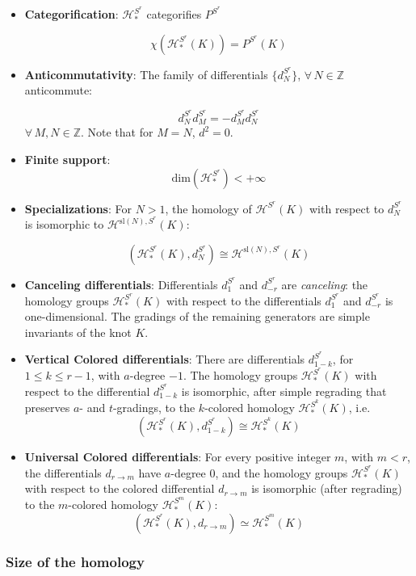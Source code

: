 \documentclass[a4paper,titlepage,twoside]{book}
\begin{document}
\begin{itemize}
\item \textbf{Categorification}: $\mathcal{H}^{S^r}_*$ categorifies $P^{S^r}$

\[
\chi{ (\mathcal{H}^{ S^r}_*{ (K) }) } = P^{ S^r}{ (K) }
\]
\item \textbf{ Anticommutativity}: The family of differentials $\lbrace d_N^{ S^r} \rbrace$, $\forall \, N \in \mathbb{Z}$  anticommute:

\[
d^{S^r}_N d^{S^r}_M = - d^{S^r}_M d^{S^r}_N
\]
$\forall \, M,N \in \mathbb{Z}$.  Note that for $M=N$, $d^2=0$.  
\item \textbf{Finite support}:
\[
\text{dim}{ (\mathcal{H}_*^{ S^r} ) } < + \infty
\]

\item \textbf{Specializations}: For $N >1$, the homology of $\mathcal{H}^{ S^r}{ (K)}$ with respect to $d^{S^r}_N$ is isomorphic to $\mathcal{H}^{ \text{sl}{(N)}, S^r}{ (K)}$: 

\[
\left( \mathcal{H}_*^{S^r}{ (K)}, d_N^{S^r}  \right) \cong \mathcal{H}^{ \text{sl}{ (N)}, S^r}{ (K)}
\]
\item \textbf{Canceling differentials}: Differentials $d_1^{S^r}$ and $d^{S^r}_{-r}$ are \emph{canceling}: the homology groups $\mathcal{H}^{ S^r}_*{ (K)}$ with respect to the differentials $d_1^{S^r}$ and $d^{S^r}_{-r}$ is one-dimensional.  The gradings of the remaining generators are simple invariants of the knot $K$.  
\item \textbf{Vertical Colored differentials}: There are differentials $d^{S^r}_{1-k}$, for $1 \leq k \leq r-1$, with $a$-degree $-1$.  The homology groups $\mathcal{H}_*^{ S^r}{ (K) }$ with respect to the differential $d^{S^r}_{ 1-k}$ is isomorphic, after simple regrading that preserves $a$- and $t$-gradings, to the $k$-colored homology $\mathcal{H}_*^{S^k}{ (K)}$, i.e.
\[
\left( \mathcal{H}_*^{S^r}{ (K) } , d^{S^r}_{ 1-k } \right) \cong \mathcal{H}_*^{ S^k}{ (K)} 
\]
\item \textbf{Universal Colored differentials}: For every positive integer $m$, with $m<r$, the differentials $d_{r\to m}$ have $a$-degree $0$, and the homology groups $\mathcal{H}_*^{S^r}{(K)}$ with respect to the colored differential $d_{r\to m}$ is isomorphic (after regrading) to the $m$-colored homology $\mathcal{H}_*^{S^m}{ (K)}$:
\[
\left( \mathcal{H}_*^{ S^r}{ (K)}, d_{r\to m} \right) \simeq \mathcal{H}_*^{S^m}{ (K)}
\]
\end{itemize}

\subsubsection{Size of the homology}
\end{document}
